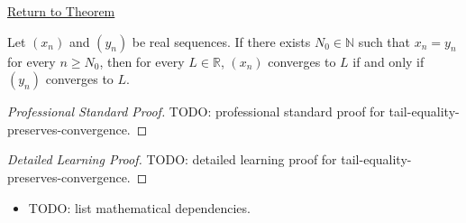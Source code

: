 \newpage
{}
\label{prf:tail-equality-preserves-convergence}

\begin{remark*}[Return]
\hyperref[thm:tail-equality-preserves-convergence]{Return to Theorem}
\end{remark*}

\begin{theorem*}
Let $(x_n)$ and $(y_n)$ be real sequences. If there exists
$N_0 \in \mathbb{N}$ such that $x_n = y_n$ for every $n \ge N_0$, then
for every $L \in \mathbb{R}$, $(x_n)$ converges to $L$ if and only if
$(y_n)$ converges to $L$.

\smallskip
\noindent
\end{theorem*}

\begin{proof}[Professional Standard Proof]
\LRAProofBodyStart
TODO: professional standard proof for tail-equality-preserves-convergence.
\end{proof}

\begin{proof}[Detailed Learning Proof]
\LRAProofBodyStart
TODO: detailed learning proof for tail-equality-preserves-convergence.
\end{proof}

\begin{remark*}
\end{remark*}

\begin{dependencies}
\begin{itemize}
  \item TODO: list mathematical dependencies.
\end{itemize}
\end{dependencies}

\clearpage
